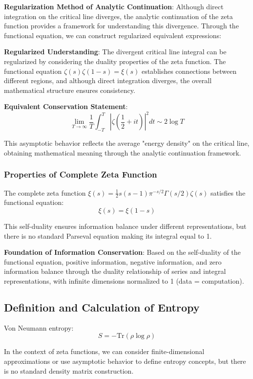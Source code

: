 \documentclass[11pt]{article}
\begin{document}
\textbf{Regularization Method of Analytic Continuation}:
Although direct integration on the critical line diverges, the analytic continuation of the zeta function provides a framework for understanding this divergence. Through the functional equation, we can construct regularized equivalent expressions:

\textbf{Regularized Understanding}:
The divergent critical line integral can be regularized by considering the duality properties of the zeta function. The functional equation $\zeta(s)\zeta(1-s) = \xi(s)$ establishes connections between different regions, and although direct integration diverges, the overall mathematical structure ensures consistency.

\textbf{Equivalent Conservation Statement}:
$$\lim_{T \to \infty} \frac{1}{T} \int_{-T}^{T} |\zeta\left(\frac{1}{2} + it\right)|^2 dt \sim 2 \log T$$

This asymptotic behavior reflects the average "energy density" on the critical line, obtaining mathematical meaning through the analytic continuation framework.

\subsubsection{Properties of Complete Zeta Function}

The complete zeta function $\xi(s) = \frac{1}{2} s(s-1) \pi^{-s/2} \Gamma(s/2) \zeta(s)$ satisfies the functional equation:
$$\xi(s) = \xi(1-s)$$

This self-duality ensures information balance under different representations, but there is no standard Parseval equation making its integral equal to 1.

\textbf{Foundation of Information Conservation}:
Based on the self-duality of the functional equation, positive information, negative information, and zero information balance through the duality relationship of series and integral representations, with infinite dimensions normalized to 1 (data = computation).

\subsection{Definition and Calculation of Entropy}

Von Neumann entropy:
$$S = -\text{Tr}(\rho \log \rho)$$

In the context of zeta functions, we can consider finite-dimensional approximations or use asymptotic behavior to define entropy concepts, but there is no standard density matrix construction.
\end{document}
